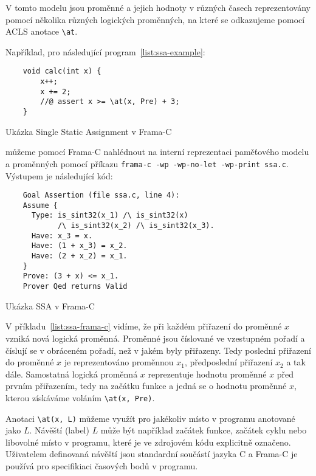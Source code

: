 V tomto modelu jsou proměnné a jejich hodnoty v různých časech reprezentovány
pomocí několika různých logických proměnných, na které se odkazujeme pomocí
ACLS anotace \texttt{\textbackslash at}.

Například, pro následující program~\ref{list:ssa-example}:

\begin{listing}[H]
    \begin{verbatim}
    void calc(int x) {
        x++;
        x += 2;
        //@ assert x >= \at(x, Pre) + 3;
    }
    \end{verbatim}
    \caption{Ukázka Single Static Assignment v Frama-C}
    \label{list:ssa-example}
\end{listing}

můžeme pomocí Frama\mbox{-}C nahlédnout na interní reprezentaci paměťového modelu
a proměnných pomocí příkazu \texttt{frama-c -wp -wp-no-let -wp-print ssa.c}.
Výstupem je následující kód:

\begin{listing}[H]
    \begin{verbatim}
    Goal Assertion (file ssa.c, line 4):
    Assume {
      Type: is_sint32(x_1) /\ is_sint32(x)
            /\ is_sint32(x_2) /\ is_sint32(x_3).
      Have: x_3 = x.
      Have: (1 + x_3) = x_2.
      Have: (2 + x_2) = x_1.
    }
    Prove: (3 + x) <= x_1.
    Prover Qed returns Valid
    \end{verbatim}
    \caption{Ukázka SSA v Frama-C}
    \label{list:ssa-frama-c}
\end{listing}

V příkladu~\ref{list:ssa-frama-c} vidíme, že při každém přiřazení do proměnné $x$ vzniká nová logická proměnná.
Proměnné jsou číslované ve vzestupném pořadí a číslují se v obráceném pořadí, než v jakém byly přiřazeny.
Tedy poslední přiřazení do proměnné $x$ je reprezentováno proměnnou $x_1$,
předposlední přiřazení $x_2$ a tak dále.
Samostatná logická proměnná $x$ reprezentuje hodnotu proměnné $x$ před prvním přiřazením,
tedy na začátku funkce a jedná se o hodnotu proměnné $x$, kterou získáváme voláním \texttt{\textbackslash at(x, Pre)}.

Anotaci \texttt{\textbackslash at(x, L)} můžeme využít pro jakékoliv místo v programu anotované jako $L$.
Návěští (label) $L$ může být například začátek funkce, začátek cyklu nebo libovolné místo v programu, které je ve zdrojovém kódu explicitně označeno.
Uživatelem definovaná návěští jsou standardní součástí jazyka C a Frama\mbox{-}C je používá pro specifikiaci časových bodů v programu.

